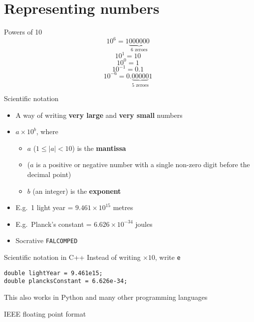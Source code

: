\part{Representing numbers}
\frame{\partpage}

\begin{frame}{Powers of 10}
	\pause
	$$ 10^6 = 1\underbrace{000000}_{\text{6 zeroes}} $$
	\pause
	$$ 10^1 = 10 $$
	\pause
	$$ 10^0 = 1 $$
	\pause
	$$ 10^{-1} = 0.1 $$
	\pause
	$$ 10^{-6} = 0.\underbrace{00000}_{\text{5 zeroes}}1 $$
\end{frame}

\begin{frame}{Scientific notation}
	\begin{itemize}
		\pause\item A way of writing \textbf{very large} and \textbf{very small} numbers
		\pause\item $a \times 10^b$, where
			\begin{itemize}
				\pause\item $a$ ($1 \leq |a| < 10$) is the \textbf{mantissa}
				\pause\item ($a$ is a positive or negative number
					with a single non-zero digit before the decimal point)
				\pause\item $b$ (an integer) is the \textbf{exponent}
			\end{itemize}
		\pause\item E.g.\ 1 light year = $9.461 \times 10^{15}$ metres
		\pause\item E.g.\ Planck's constant = $6.626 \times 10^{-34}$ joules
		\pause\item Socrative \texttt{FALCOMPED}
	\end{itemize}
\end{frame}

\begin{frame}[fragile]{Scientific notation in C++}
	\pause Instead of writing $\times 10$, write \lstinline{e}
	\pause
	\begin{lstlisting}
double lightYear = 9.461e15;
double plancksConstant = 6.626e-34;
	\end{lstlisting}
	\pause This also works in Python and many other programming languages
\end{frame}

\begin{frame}{IEEE floating point format}
\end{frame}
